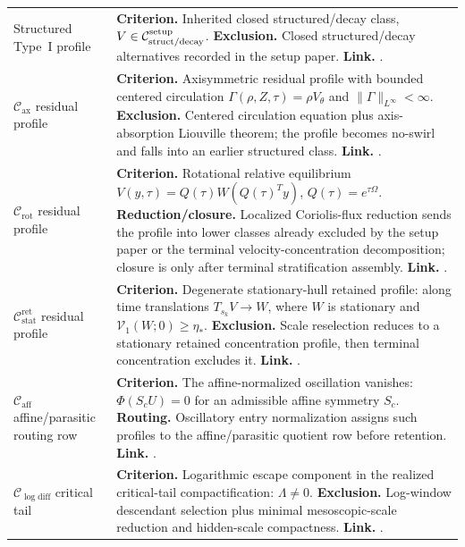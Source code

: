 \documentclass[11pt]{amsart}
\numberwithin{equation}{section}
\theoremstyle{plain}
\theoremstyle{definition}
\theoremstyle{remark}
\newcommand{\Vel}{\mathcal V}
\newcommand{\Cax}{\mathcal C_{\mathrm{ax}}}
\newcommand{\Crot}{\mathcal C_{\mathrm{rot}}}
\newcommand{\Cstat}{\mathcal C_{\mathrm{stat}}^{\mathrm{ret}}}
\newcommand{\Caff}{\mathcal C_{\mathrm{aff}}}
\newcommand{\Clogdiff}{\mathcal C_{\log\mathrm{diff}}}
\begin{document}
\begin{longtable}{@{}L{1.20in}L{4.65in}@{}}
Structured Type~I profile &
\textbf{Criterion.}  Inherited closed structured/decay class,
\(V\in\mathcal C_{\rm struct/decay}^{\rm setup}\).
\textbf{Exclusion.}  Closed structured/decay alternatives recorded in the
setup paper.
\textbf{Link.}  .\\

\(\Cax\) residual profile &
\textbf{Criterion.}  Axisymmetric residual profile with bounded centered
circulation \(\Gamma(\rho,Z,\tau)=\rho V_\theta\) and
\(\|\Gamma\|_{L^\infty}<\infty\).
\textbf{Exclusion.}  Centered circulation equation plus axis-absorption
Liouville theorem; the profile becomes no-swirl and falls into an earlier
structured class.
\textbf{Link.}  .\\

\(\Crot\) residual profile &
\textbf{Criterion.}  Rotational relative equilibrium
\(V(y,\tau)=Q(\tau)W(Q(\tau)^Ty)\), \(Q(\tau)=e^{\tau\Omega}\).
\textbf{Reduction/closure.}  Localized Coriolis-flux reduction sends the profile
into lower classes already excluded by the setup paper or the terminal velocity-concentration
decomposition; closure is only after terminal stratification assembly.
\textbf{Link.}
.\\

\(\Cstat\) residual profile &
\textbf{Criterion.}  Degenerate stationary-hull retained profile: along
time translations \(T_{s_k}V\to W\), where \(W\) is stationary and
\(\Vel_1(W;0)\ge\eta_*\).
\textbf{Exclusion.}  Scale reselection reduces to a stationary retained
concentration profile, then terminal concentration excludes it.
\textbf{Link.}
.\\

\(\Caff\) affine/parasitic routing row &
\textbf{Criterion.}  The affine-normalized oscillation vanishes:
\(\Phi(S_cU)=0\) for an admissible affine symmetry \(S_c\).
\textbf{Routing.}  Oscillatory entry normalization assigns such profiles to the
affine/parasitic quotient row before retention.
\textbf{Link.}  .\\

\(\Clogdiff\) critical tail &
\textbf{Criterion.}  Logarithmic escape component in the realized
critical-tail compactification: \(\Lambda\ne0\).
\textbf{Exclusion.}  Log-window descendant selection plus minimal
mesoscopic-scale reduction and hidden-scale compactness.
\textbf{Link.}  .\\


\end{longtable}
\end{document}
